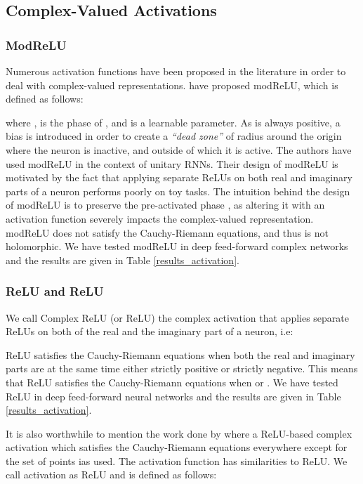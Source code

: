 \documentclass{article}
\begin{document}
\subsection{Complex-Valued Activations}\label{activation_func}
\subsubsection{ModReLU}
Numerous activation functions have been proposed in the literature in order to deal with complex-valued representations. \citep{arjovsky2015unitary} have proposed modReLU, which is defined as follows:

where ,  is the phase of , and  is a learnable parameter. As  is always positive, a bias  is introduced in order to create a \textit{``dead zone''} of radius  around the origin  where the neuron is inactive, and outside of which it is active. The authors have used modReLU in the context of unitary RNNs. Their design of modReLU is motivated by the fact that applying separate ReLUs on both real and imaginary parts of a neuron performs poorly on toy tasks. The intuition behind the design of modReLU is to preserve the pre-activated phase , as altering it with an activation function severely impacts the complex-valued representation. modReLU does not satisfy the Cauchy-Riemann equations, and thus is not holomorphic. We have tested modReLU in deep feed-forward complex networks and the results are given in Table \ref{results_activation}.

\subsubsection{ReLU and ReLU}
We call Complex ReLU (or ReLU) the complex activation that applies separate ReLUs on both of the real and the imaginary part of a neuron, i.e:

ReLU satisfies the Cauchy-Riemann equations when both the real and imaginary parts are at the same time either strictly positive or strictly negative. This means that ReLU satisfies the Cauchy-Riemann equations when  or . We have tested ReLU in deep feed-forward neural networks and the results are given in Table \ref{results_activation}.

It is also worthwhile to mention the work done by \cite{guberman2016complex} where a ReLU-based complex activation which satisfies the Cauchy-Riemann equations everywhere except for the set of points  ias used. The activation function has similarities to ReLU. We call \cite{guberman2016complex} activation as ReLU and is defined as follows:
\end{document}
